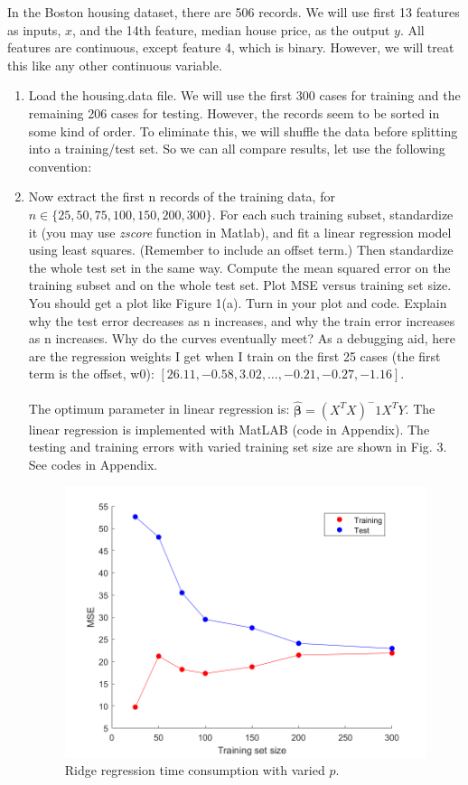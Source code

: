 \documentclass[11pt]{article}
\newcommand{\mfile}[1]  {{\small }} %
\newcommand{\mtx}[1]{\mathbf{#1}}
\def \mbeta {\mtx{\beta}}
\begin{document}
In the Boston housing dataset, there are 506 records. We will
use first 13 features as inputs, $x$, and the 14th feature, median house price, as the output $y$. All features are continuous,
except feature 4, which is binary. However, we will treat this like any other continuous variable.
\begin{enumerate}
	\item Load the housing.data file. We will use the first 300 cases for training and the remaining 206 cases for
	testing. However, the records seem to be sorted in some kind of order. To eliminate this, we will shuffle the data
	before splitting into a training/test set. So we can all compare results, let use the following convention:
	\mfile{sample.m}


	\item Now extract the first n records of the training data, for $n \in \{25, 50, 75, 100, 150, 200, 300\}$. For each such
	training subset, standardize it (you may use \textit{zscore} function in Matlab), and fit a linear regression model using least squares. (Remember to include
	an offset term.) Then standardize the whole test set in the same way. Compute the mean squared error on
	the training subset and on the whole test set. Plot MSE versus training set size. You should get a plot like
	Figure 1(a). Turn in your plot and code. Explain why the test error decreases as n increases, and why the train
	error increases as n increases. Why do the curves eventually meet?
	As a debugging aid, here are the regression weights I get when I train on the first 25 cases (the first term is the
	offset, w0): $[26.11, -0.58, 3.02,\dots,-0.21, -0.27, -1.16]$.
\\ \\
The optimum parameter in linear regression is: $\hat{\mbeta}=(X^TX)^-1X^TY$. The linear regression is implemented with MatLAB (code in Appendix). The testing and training errors with varied training set size are shown in Fig. 3. See codes in Appendix.

\begin{figure}[h] %
\centering\includegraphics[width=0.45\linewidth]{prob4_2.png}
\caption{Ridge regression time consumption with varied $p$.} %
\label{fig:prob4_2}  %
\end{figure}


\end{enumerate}
\end{document}
